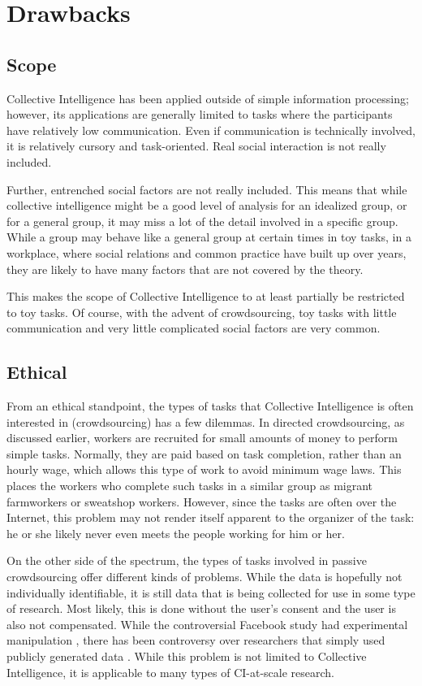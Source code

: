 \section{Drawbacks}

\subsection{Scope}

Collective Intelligence has been applied outside of simple information processing; however, its applications are generally limited to tasks where the participants have relatively low communication. Even if communication is technically involved, it is relatively cursory and task-oriented. Real social interaction is not really included.

Further, entrenched social factors are not really included. This means that while collective intelligence might be a good level of analysis for an idealized group, or for a general group, it may miss a lot of the detail involved in a specific group. While a group may behave like a general group at certain times in toy tasks, in a workplace, where social relations and common practice have built up over years, they are likely to have many factors that are not covered by the theory. 

This makes the scope of Collective Intelligence to at least partially be restricted to toy tasks. Of course, with the advent of crowdsourcing, toy tasks with little communication and very little complicated social factors are very common. 

\subsection{Ethical}

From an ethical standpoint, the types of tasks that Collective Intelligence is often interested in (crowdsourcing) has a few dilemmas. In directed crowdsourcing, as discussed earlier, workers are recruited for small amounts of money to perform simple tasks. Normally, they are paid based on task completion, rather than an hourly wage, which allows this type of work to avoid minimum wage laws. This places the workers who complete such tasks in a similar group as migrant farmworkers or sweatshop workers. However, since the tasks are often over the Internet, this problem may not render itself apparent to the organizer of the task: he or she likely never even meets the people working for him or her. 

On the other side of the spectrum, the types of tasks involved in passive crowdsourcing offer different kinds of problems. While the data is hopefully not individually identifiable, it is still data that is being collected for use in some type of research. Most likely, this is done without the user's consent and the user is also not compensated. While the controversial Facebook study had experimental manipulation \cite{facebook1}, there has been controversy over researchers that simply used publicly generated data \cite{facebook2}. While this problem is not limited to Collective Intelligence, it is applicable to many types of CI-at-scale research.  

